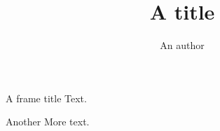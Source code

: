 \documentclass{beamer}
\title{A title}
\author{An author}
\begin{document}
\begin{frame}{A frame title}
Text.
\end{frame}
\begin{frame}{Another}
More text.
\end{frame}
\end{document}
